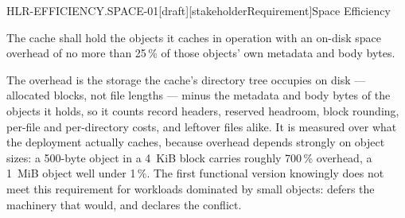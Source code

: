 \begin{requirement}{HLR-EFFICIENCY.SPACE-01}[draft][stakeholderRequirement]{Space Efficiency}


  The cache shall hold the objects it caches in operation with an on-disk
  space overhead of no more than 25\,\% of those objects' own metadata and
  body bytes.

  The overhead is the storage the cache's directory tree occupies on disk ---
  allocated blocks, not file lengths --- minus the metadata and body bytes of
  the objects it holds, so it counts record headers, reserved headroom,
  block rounding, per-file and per-directory costs, and leftover files alike.
  It is measured over what the deployment actually caches, because overhead
  depends strongly on object sizes: a 500-byte object in a 4~KiB block carries
  roughly 700\,\% overhead, a 1~MiB object well under 1\,\%. The first
  functional version knowingly does not meet this requirement for workloads
  dominated by small objects:  defers the
  machinery that would, and declares the conflict.


\end{requirement}

